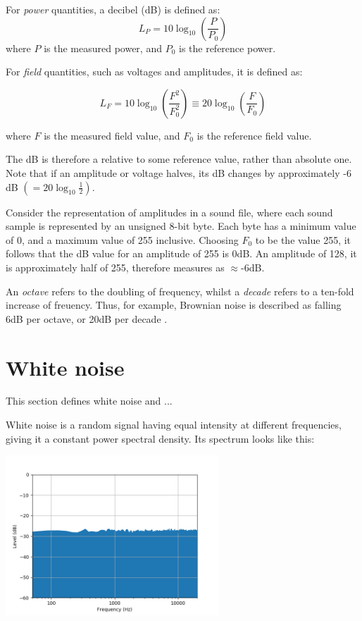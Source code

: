 \documentclass[a4paper,10pt]{article}
\begin{document}
For \emph{power} quantities, a decibel (dB) is defined \cite{dB} as: 
\begin{equation}
 L_P = 10 \log_{10}\left(\frac{P}{P_0}\right)
\end{equation}
where $P$ is the measured power, and $P_0$ is the reference power.

For \emph{field} quantities, such as voltages and amplitudes, it is defined as:

\begin{equation}
 L_F = 10 \log_{10}\left(\frac{F^2}{F^2_0}\right) \equiv 20 \log_{10}\left(\frac{F}{F_0}\right)
\end{equation}

where $F$ is the measured field value, and $F_0$ is the reference field value.

The dB is therefore a relative to some reference value, rather than absolute one. Note that if an amplitude or voltage halves, its dB changes by approximately -6 dB $( = 20 \log_{10}\frac{1}{2})$.

Consider the representation of amplitudes in a sound file, where each sound sample is represented by an unsigned 8-bit byte. Each byte has a minimum value of 0, and a maximum value of 255 inclusive. Choosing $F_0$ to be the value 255, it follows that the dB value for an amplitude of 255 is 0dB. An amplitude of 128, it is approximately half of 255, therefore measures as $\approx$-6dB.

An \emph{octave} refers to the doubling of frequency, whilst a \emph{decade} refers to a ten-fold increase of freuency. Thus, for example, Brownian noise is described as falling 6dB per octave, or 20dB per decade \cite{brown}.


\section{White noise}
This section defines white noise and ...

White noise is a random signal having equal intensity at different frequencies, giving it a constant power spectral density\cite{wiki_white}. Its spectrum looks like this:

\begin{center}
\includegraphics[height=6cm]{white.png}
\end{center}
\end{document}
